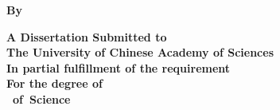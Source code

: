 \newpage
\thispagestyle{empty}

\vspace{1cm}

\begin{center}
    \songti\sanhao\bfseries \uline{\ioatitlee}          
\end{center}
\vspace{2cm}
\begin{center}
    \textbf{\sanhao By\\\xiaosan \ioaauthornamee}
\end{center}
\vspace{2cm}
\begin{center}
    \sanhao\bfseries A Dissertation Submitted to\\
    The University of Chinese Academy of Sciences\\
    In partial fulfillment of the requirement\\
    For the degree of\\
    \ioadegreee~of~Science

    \vspace{2cm}
    \ioadepartmente

  \makebox{\songti\sihao\textbf{\ioadatee}}
\end{center}


